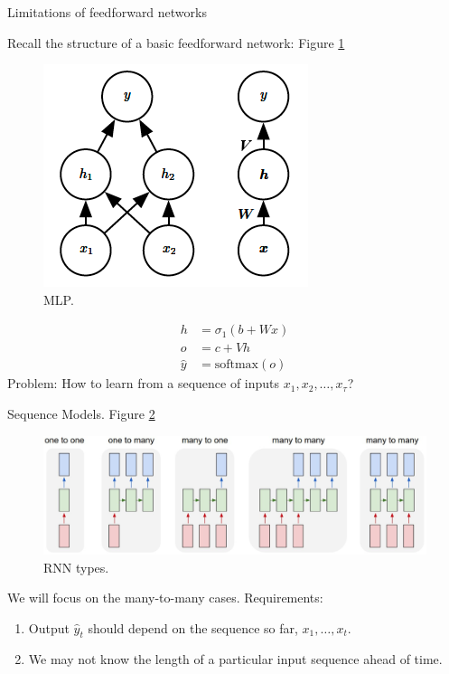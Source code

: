 \documentclass[english]{article}
\begin{document}
\item 
 {Limitations of feedforward networks}

Recall the structure of a basic feedforward network:  Figure \ref{MLP}
\begin{figure}
  \centering
\includegraphics[width=0.4\linewidth]{mlp.png}
    \caption{MLP.}
    \label{MLP}
\end{figure}

\begin{align*}
h &= \sigma_1(b+Wx)\\
o &= c+Vh\\
\hat{y} &= \text{softmax}(o)
\end{align*}
Problem: How to learn from a sequence of inputs $x_1, x_2,\dots,x_\tau$?

 

\item 
 {Sequence Models}.  Figure \ref{rnn-types}

\begin{figure}
  \centering
\includegraphics[width=0.9\linewidth]{rnn-types.png}
    \caption{RNN types.}
    \label{rnn-types}
\end{figure}
We will focus on the many-to-many cases. Requirements:
\begin{enumerate}
\item Output $\hat{y}_t$ should depend on the sequence so far, $x_1,\dots,x_t$.
\item We may not know the length of a particular input sequence ahead of time.
\end{enumerate}
\eenum
\end{document}
